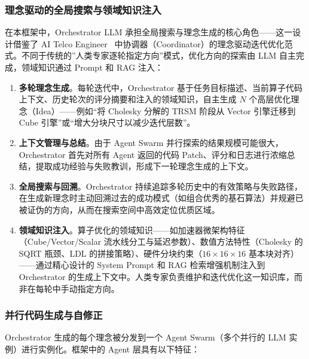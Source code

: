 \documentclass{CjC}
\begin{document}
    \subsubsection{理念驱动的全局搜索与领域知识注入}

    在本框架中，Orchestrator LLM 承担全局搜索与理念生成的核心角色——这一设计借鉴了
    AI Telco Engineer~\cite{aitaoudia2026aitelcoengineer} 中协调器（Coordinator）的理念驱动迭代优化范式。不同于传统的”人类专家逐轮指定方向”模式，优化方向的探索由
    LLM 自主完成，领域知识通过 Prompt 和 RAG 注入：

    \begin{enumerate}
        \item \textbf{多轮理念生成}。每轮迭代中，Orchestrator 基于任务目标描述、当前算子代码上下文、历史轮次的评分摘要和注入的领域知识，自主生成
            $N$ 个高层优化理念（Idea）——例如“将 Cholesky 分解的 TRSM 阶段从 Vector
            引擎迁移到 Cube 引擎”或“增大分块尺寸以减少迭代层数”。

        \item \textbf{上下文管理与总结}。由于 Agent Swarm 并行探索的结果规模可能很大，Orchestrator
            首先对所有 Agent 返回的代码 Patch、评分和日志进行浓缩总结，提取成功经验与失败教训，形成下一轮理念生成的上下文。

        \item \textbf{全局搜索与回溯}。Orchestrator 持续追踪多轮历史中的有效策略与失败路径，在生成新理念时主动回溯过去的成功模式（如组合优秀的基石算法）并规避已被证伪的方向，从而在搜索空间中高效定位优质区域。

        \item \textbf{领域知识注入}。算子优化的领域知识——如加速器微架构特征（Cube/Vector/Scalar
            流水线分工与延迟参数）、数值方法特性（Cholesky 的 SQRT 瓶颈、LDL 的拼接策略）、硬件分块约束（$1
            6\times16\times16$
            基本块对齐）——通过精心设计的 System Prompt 和 RAG 检索增强机制注入到
            Orchestrator
            的生成上下文中。人类专家负责维护和迭代优化这一知识库，而非在每轮中手动指定方向。
    \end{enumerate}

    \subsubsection{并行代码生成与自修正}

    Orchestrator 生成的每个理念被分发到一个 Agent Swarm（多个并行的 LLM
    实例）进行实例化。框架中的 Agent 层具有以下特征：
\end{document}
